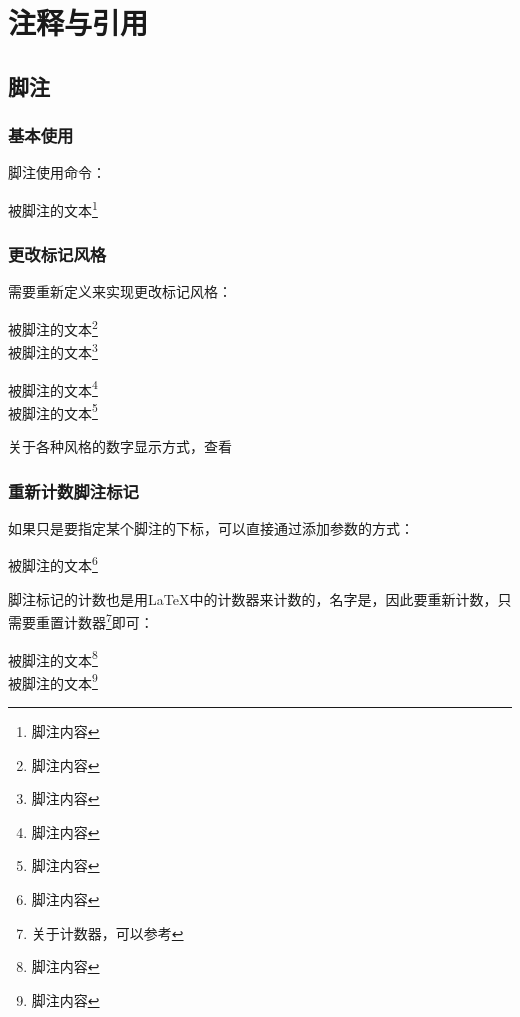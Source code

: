 \section{注释与引用}\label{sec:注释与引用}
    \subsection{脚注}
    \subsubsection{基本使用}
    脚注使用命令：
    \begin{texshow}
        被脚注的文本\footnote{脚注内容}
    \end{texshow}
    \subsubsection{更改标记风格}
    需要重新定义来实现更改标记风格：

    \begin{texcode}
        被脚注的文本\footnote{脚注内容}\\
        \renewcommand{\thefootnote}{\roman{footnote}}
        被脚注的文本\footnote{脚注内容}
    \end{texcode}

    
    被脚注的文本\footnote{脚注内容}\\\renewcommand{\thefootnote}{\roman{footnote}}
    被脚注的文本\footnote{脚注内容}

    关于各种风格的数字显示方式，查看
    \subsubsection{重新计数脚注标记}
    如果只是要指定某个脚注的下标，可以直接通过添加参数的方式：
    \begin{texshow}
        被脚注的文本\footnote[12]{脚注内容}
    \end{texshow}


    脚注标记的计数也是用\LaTeX{}中的计数器来计数的，名字是，因此要重新计数，只需要重置计数器\footnote{关于计数器，可以参考}即可：
    \begin{texcode}
        被脚注的文本\footnote{脚注内容}\\
        \setcounter{footnote}{5}
        被脚注的文本\footnote{脚注内容}
    \end{texcode}

